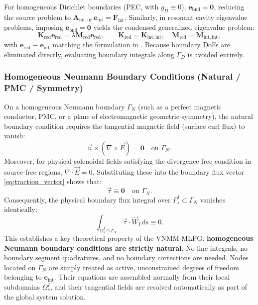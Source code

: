 \documentclass[VANCOUVER,Times1COL]{WileyNJD-v5}
\begin{document}
For homogeneous Dirichlet boundaries (PEC, with $g_D \equiv 0$), $\mathbf{e}_{\mathrm{bnd}} = \mathbf{0}$, reducing the source problem to $\mathbf{A}_{\mathrm{int}, \mathrm{int}} \mathbf{e}_{\mathrm{int}} = \mathbf{F}_{\mathrm{int}}$. Similarly, in resonant cavity eigenvalue problems, imposing $\mathbf{e}_{\mathrm{bnd}} = \mathbf{0}$ yields the condensed generalized eigenvalue problem:
\begin{equation}
    \mathbf{K}_{\mathrm{red}} \mathbf{e}_{\mathrm{red}} = \lambda \mathbf{M}_{\mathrm{red}} \mathbf{e}_{\mathrm{red}}, \qquad \mathbf{K}_{\mathrm{red}} = \mathbf{K}_{\mathrm{int}, \mathrm{int}}, \quad \mathbf{M}_{\mathrm{red}} = \mathbf{M}_{\mathrm{int}, \mathrm{int}},
    \label{eq:reduced_eigenproblem}
\end{equation}
with $\mathbf{e}_{\mathrm{red}} \equiv \mathbf{e}_{\mathrm{int}}$ matching the formulation in \cite{stable_vnmm2d_2026}.
Because boundary DoFs are eliminated directly, evaluating boundary integrals along $\Gamma_D$ is avoided entirely.

\subsubsection{Homogeneous Neumann Boundary Conditions (Natural / PMC / Symmetry)}
\label{subsubsec:neumann_homogeneous}

On a homogeneous Neumann boundary $\Gamma_N$ (such as a perfect magnetic conductor, PMC, or a plane of electromagnetic geometric symmetry), the natural boundary condition requires the tangential magnetic field (surface curl flux) to vanish:
\begin{equation}
    \vec{n} \times (\nabla \times \vec{E}) = \mathbf{0} \quad \text{on } \Gamma_N.
    \label{eq:neumann_homogeneous_pde}
\end{equation}
Moreover, for physical solenoidal fields satisfying the divergence-free condition in source-free regions, $\nabla \cdot \vec{E} = 0$. Substituting these into the boundary flux vector \eqref{eq:traction_vector} shows that:
\begin{equation}
    \vec{\tau} \equiv \mathbf{0} \quad \text{on } \Gamma_N.
\end{equation}
Consequently, the physical boundary flux integral over $\Gamma_s^I \subset \Gamma_N$ vanishes identically:
\begin{equation}
    \int_{\Omega_s^I \cap \Gamma_N} \vec{\tau} \cdot \vec{W}_I \, ds \equiv 0.
\end{equation}
This establishes a key theoretical property of the VNMM-MLPG: \textbf{homogeneous Neumann boundary conditions are strictly natural}. No line integrals, no boundary segment quadratures, and no boundary corrections are needed. Nodes located on $\Gamma_N$ are simply treated as active, unconstrained degrees of freedom belonging to $\mathbf{e}_{\mathrm{int}}$. Their equations are assembled normally from their local subdomains $\Omega_s^I$, and their tangential fields are resolved automatically as part of the global system solution.
\end{document}
